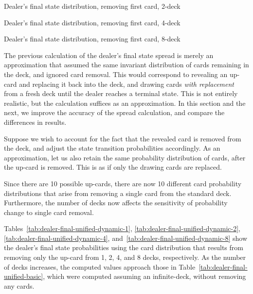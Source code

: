 \begin{table}[ht!]
\caption{Dealer's final state distribution, removing first card, 2-deck}
\begin{center}

\end{center}
\label{tab:dealer-final-unified-dynamic-2}
\end{table}

\begin{table}[ht!]
\caption{Dealer's final state distribution, removing first card, 4-deck}
\begin{center}

\end{center}
\label{tab:dealer-final-unified-dynamic-4}
\end{table}

\begin{table}[ht!]
\caption{Dealer's final state distribution, removing first card, 8-deck}
\begin{center}

\end{center}
\label{tab:dealer-final-unified-dynamic-8}
\end{table}

The previous calculation of the dealer's final state spread
is merely an approximation that assumed the same invariant distribution of 
cards remaining in the deck, and ignored card removal.  
This would correspond to revealing an up-card 
and replacing it back into the deck, 
and drawing cards \emph{with replacement} from a fresh deck until 
the dealer reaches a terminal state.
This is not entirely realistic, but the calculation suffices
as an approximation.
In this section and the next, we improve the accuracy of 
the spread calculation, and compare the differences in results.  

Suppose we wish to account for the fact that the revealed card
is removed from the deck, and adjust the state transition 
probabilities accordingly.  
As an approximation, let us also retain the same probability
distribution of cards, after the up-card is removed.
This is as if only the drawing cards are replaced.  

Since there are 10 possible up-cards, 
there are now 10 different card probability distributions
that arise from removing a single card from the standard deck.
Furthermore, the number of decks now affects the
sensitivity of probability change to single card removal.

Tables~\ref{tab:dealer-final-unified-dynamic-1},
\ref{tab:dealer-final-unified-dynamic-2},
\ref{tab:dealer-final-unified-dynamic-4},
and~\ref{tab:dealer-final-unified-dynamic-8}
show the dealer's final state probabilities using the
card distribution that results from removing only the up-card
from 1, 2, 4, and 8 decks, respectively.
As the number of decks increases, the computed values approach
those in Table~\ref{tab:dealer-final-unified-basic}, 
which were computed assuming an infinite-deck, 
without removing any cards.


